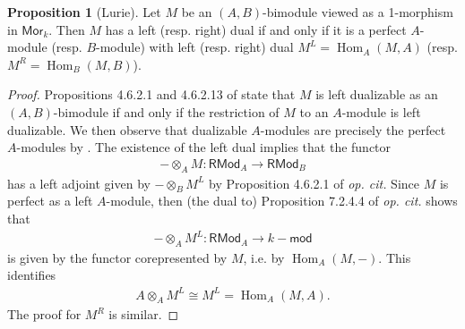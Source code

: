 \documentclass{article}
\numberwithin{equation}{section}
\theoremstyle{quest}
\theoremstyle{definition}
\newtheorem{prop}[thm]{Proposition}
\theoremstyle{remark}
\newcommand{\msf}{\mathsf}
\newcommand{\Mod}{-\msf{mod}}
\DeclareMathOperator{\Hom}{Hom}
\begin{document}
\begin{prop}[Lurie]\label{prop:dual}
	Let $M$ be an $(A,B)$-bimodule viewed as a 1-morphism in $\mathsf{Mor}_k$. Then $M$ has a left (resp. right) dual if and only if it is a perfect $A$-module (resp. $B$-module) with left (resp. right) dual $M^L=\Hom_A(M,A)$ (resp. $M^R=\Hom_B(M,B)$).
\end{prop} 
\begin{proof}
	Propositions 4.6.2.1 and 4.6.2.13 of \cite{HA} state that $M$ is left dualizable as an $(A,B)$-bimodule if and only if the restriction of $M$ to an $A$-module is left dualizable. We then observe that dualizable $A$-modules are precisely the perfect $A$-modules by \cite[Proposition 7.2.4.2]{HA}. The existence of the left dual implies that the functor
	\begin{align*}
		-\otimes _A M: \mathsf{RMod}_A\to \mathsf{RMod}_B
	\end{align*} 
	has a left adjoint given by $-\otimes _B M^L$ by Proposition 4.6.2.1 of \textit{op. cit.} Since $M$ is perfect as a left $A$-module, then (the dual to) Proposition 7.2.4.4 of \textit{op. cit.} shows that 
	\begin{align*}
		-\otimes _A M^L:\mathsf{RMod}_A\to k\Mod
	\end{align*} 
	is given by the functor corepresented by $M$, i.e. by $\Hom_A(M,-)$. This identifies 
	\begin{align*}
		A\otimes_A M^L\cong M^L=\Hom_A(M,A).
	\end{align*} 
	The proof for $M^R $ is similar.
\end{proof} 
 



		
\end{document}
